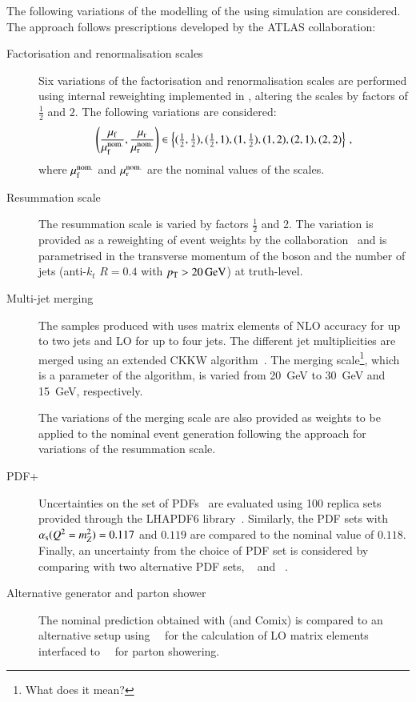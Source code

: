 The following variations of the modelling of the \ZHF using simulation
are considered. The approach follows prescriptions developed by the
ATLAS collaboration:
\begin{description}
\item[Factorisation and renormalisation scales] Six variations of the
factorisation and renormalisation scales are performed using
  internal reweighting implemented in \SHERPA[2.2.1], altering the
  scales by factors of $\frac{1}{2}$ and $2$. The following variations
  are considered:
  \begin{align*}
    \left( \frac{\mu_\mathrm{f}}{\mu_\mathrm{f}^{\text{nom.}}}, \frac{\mu_\mathrm{r}}{\mu_\mathrm{r}^{\text{nom.}}} \right) \in
    \left\{ (\tfrac{1}{2}, \tfrac{1}{2}), (\tfrac{1}{2}, 1), (1, \tfrac{1}{2}), (1, 2), (2, 1), (2, 2) \right\} \,\text{,}
  \end{align*}
  where $\mu_\mathrm{f}^{\text{nom.}}$ and $\mu_\mathrm{r}^{\text{nom.}}$ are the nominal
  values of the scales.

\item[Resummation scale] The resummation scale 
  is varied by factors $\frac{1}{2}$ and 2. The variation is provided
  as a reweighting of event weights by the
  collaboration~\cite{anders:2017} and is parametrised in the
  transverse momentum of the \PZ boson and the number of jets
  (anti-$k_{t}$ $R = 0.4$ with $\pT > \SI{20}{\GeV}$) at truth-level.

\item[Multi-jet merging] The \Vjets samples produced with
  \SHERPA[2.2.1] uses matrix elements of NLO accuracy for up to two
  jets and LO for up to four jets. The different jet multiplicities
  are merged using an extended CKKW
  algorithm~\cite{Catani:2001cc,Hoeche:2009rj}. The merging
  scale\footnote{What does it mean?}, which is a parameter of the
  algorithm, is varied from \SI{20}{\GeV} to \SI{30}{\GeV} and
  \SI{15}{\GeV}, respectively.

  The variations of the merging scale are also provided as weights to
  be applied to the nominal event generation following the approach
  for variations of the resummation scale.

\item[PDF+\alphas] Uncertainties on the \NNPDF[3.0nnlo] set of
  PDFs~\cite{Ball:2014uwa} are evaluated using 100 replica sets
  provided through the \textsc{LHAPDF6}
  library~\cite{Buckley:2014ana}. Similarly, the \NNPDF[3.0nnlo] PDF
  sets with $\alpha_{\text{s}}(Q^2=m_{Z}^2) = 0.117$ and $0.119$ are compared to
  the nominal value of $0.118$. Finally, an uncertainty from the
  choice of PDF set is considered by comparing with two alternative
  PDF sets, \MMHT[nnlo68cl]~\cite{Harland-Lang:2014zoa} and
  \CT[14nnlo]~\cite{Dulat:2015mca}.

\item[Alternative generator and parton shower] The nominal prediction
  obtained with \SHERPA[2.2.1] (\OPENLOOPS and Comix) is compared to
  an alternative setup using~\MGNLO[2.2.2]~\cite{Alwall:2014hca} for
  the calculation of LO matrix elements interfaced
  to~\PYTHIA[8.186]~\cite{Sjostrand:2007gs} for parton showering.

\end{description}
